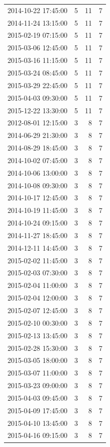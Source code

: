 \begin{tabular}{lrrr}
2014-10-22 17:45:00 & 5 & 11 & 7 \\
2014-11-24 13:15:00 & 5 & 11 & 7 \\
2015-02-19 07:15:00 & 5 & 11 & 7 \\
2015-03-06 12:45:00 & 5 & 11 & 7 \\
2015-03-16 11:15:00 & 5 & 11 & 7 \\
2015-03-24 08:45:00 & 5 & 11 & 7 \\
2015-03-29 22:45:00 & 5 & 11 & 7 \\
2015-04-03 09:30:00 & 5 & 11 & 7 \\
2015-12-22 13:30:00 & 5 & 11 & 7 \\
2012-08-01 12:15:00 & 3 & 8 & 7 \\
2014-06-29 21:30:00 & 3 & 8 & 7 \\
2014-08-29 18:45:00 & 3 & 8 & 7 \\
2014-10-02 07:45:00 & 3 & 8 & 7 \\
2014-10-06 13:00:00 & 3 & 8 & 7 \\
2014-10-08 09:30:00 & 3 & 8 & 7 \\
2014-10-17 12:45:00 & 3 & 8 & 7 \\
2014-10-19 11:45:00 & 3 & 8 & 7 \\
2014-10-24 09:15:00 & 3 & 8 & 7 \\
2014-11-27 18:45:00 & 3 & 8 & 7 \\
2014-12-11 14:45:00 & 3 & 8 & 7 \\
2015-02-02 11:45:00 & 3 & 8 & 7 \\
2015-02-03 07:30:00 & 3 & 8 & 7 \\
2015-02-04 11:00:00 & 3 & 8 & 7 \\
2015-02-04 12:00:00 & 3 & 8 & 7 \\
2015-02-07 12:45:00 & 3 & 8 & 7 \\
2015-02-10 00:30:00 & 3 & 8 & 7 \\
2015-02-13 13:45:00 & 3 & 8 & 7 \\
2015-02-28 15:30:00 & 3 & 8 & 7 \\
2015-03-05 18:00:00 & 3 & 8 & 7 \\
2015-03-07 11:00:00 & 3 & 8 & 7 \\
2015-03-23 09:00:00 & 3 & 8 & 7 \\
2015-04-03 09:45:00 & 3 & 8 & 7 \\
2015-04-09 17:45:00 & 3 & 8 & 7 \\
2015-04-10 13:45:00 & 3 & 8 & 7 \\
2015-04-16 09:15:00 & 3 & 8 & 7 \\

\end{tabular}
